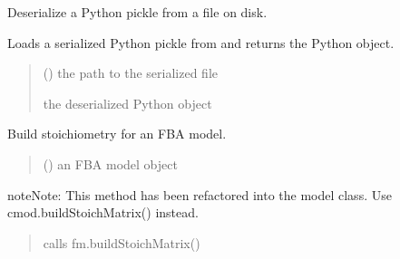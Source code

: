 \documentclass[letterpaper,12pt,english]{sphinxmanual}
\begin{document}

\begin{fulllineitems}
\label{\detokenize{api/core:cbmpy.CBTools.deSerializeFromDisk}}
\pysigstartsignatures
\pysiglinewithargsret
{}
{}
{}
\pysigstopsignatures
\sphinxAtStartPar
Deserialize a Python pickle from a file on disk.

\sphinxAtStartPar
Loads a serialized Python pickle from  and returns the Python object.
\begin{quote}\begin{description}
\sphinxAtStartPar
{} () \textendash{} the path to the serialized file

\sphinxAtStartPar
{} \textendash{} the deserialized Python object

\end{description}\end{quote}

\end{fulllineitems}


\begin{fulllineitems}
\label{\detokenize{api/core:cbmpy.CBTools.addStoichToFBAModel}}
\pysigstartsignatures
\pysiglinewithargsret
{}
{}
{}
\pysigstopsignatures
\sphinxAtStartPar
Build stoichiometry for an FBA model.
\begin{quote}\begin{description}
\sphinxAtStartPar
{} () \textendash{} an FBA model object

\end{description}\end{quote}

\begin{sphinxadmonition}{note}{Note:}
\sphinxAtStartPar
This method has been refactored into the model class. Use cmod.buildStoichMatrix() instead.
\end{sphinxadmonition}
\begin{quote}\begin{description}
\sphinxAtStartPar
{} \textendash{} calls fm.buildStoichMatrix()

\end{description}\end{quote}

\end{fulllineitems}
\end{document}
